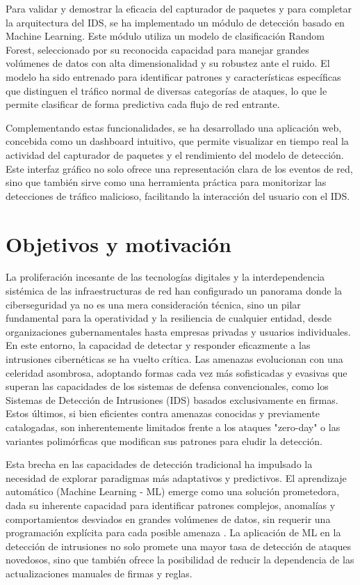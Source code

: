 Para validar y demostrar la eficacia del capturador de paquetes y para completar la arquitectura del IDS, se ha implementado un módulo de detección basado en Machine Learning. Este módulo utiliza un modelo de clasificación Random Forest, seleccionado por su reconocida capacidad para manejar grandes volúmenes de datos con alta dimensionalidad y su robustez ante el ruido. El modelo ha sido entrenado para identificar patrones y características específicas que distinguen el tráfico normal de diversas categorías de ataques, lo que le permite clasificar de forma predictiva cada flujo de red entrante.

Complementando estas funcionalidades, se ha desarrollado una aplicación web, concebida como un dashboard intuitivo, que permite visualizar en tiempo real la actividad del capturador de paquetes y el rendimiento del modelo de detección. Este interfaz gráfico no solo ofrece una representación clara de los eventos de red, sino que también sirve como una herramienta práctica para monitorizar las detecciones de tráfico malicioso, facilitando la interacción del usuario con el IDS.

\section{Objetivos y motivación}

La proliferación incesante de las tecnologías digitales y la interdependencia sistémica de las infraestructuras de red han configurado un panorama donde la ciberseguridad ya no es una mera consideración técnica, sino un pilar fundamental para la operatividad y la resiliencia de cualquier entidad, desde organizaciones gubernamentales hasta empresas privadas y usuarios individuales. En este entorno, la capacidad de detectar y responder eficazmente a las intrusiones cibernéticas se ha vuelto crítica. Las amenazas evolucionan con una celeridad asombrosa, adoptando formas cada vez más sofisticadas y evasivas que superan las capacidades de los sistemas de defensa convencionales, como los Sistemas de Detección de Intrusiones (IDS) basados exclusivamente en firmas. Estos últimos, si bien eficientes contra amenazas conocidas y previamente catalogadas, son inherentemente limitados frente a los ataques "zero-day" o las variantes polimórficas que modifican sus patrones para eludir la detección.

Esta brecha en las capacidades de detección tradicional ha impulsado la necesidad de explorar paradigmas más adaptativos y predictivos. El aprendizaje automático (Machine Learning - ML) emerge como una solución prometedora, dada su inherente capacidad para identificar patrones complejos, anomalías y comportamientos desviados en grandes volúmenes de datos, sin requerir una programación explícita para cada posible amenaza \cite{Zhang2022AICybersecurity}. La aplicación de ML en la detección de intrusiones no solo promete una mayor tasa de detección de ataques novedosos, sino que también ofrece la posibilidad de reducir la dependencia de las actualizaciones manuales de firmas y reglas.

